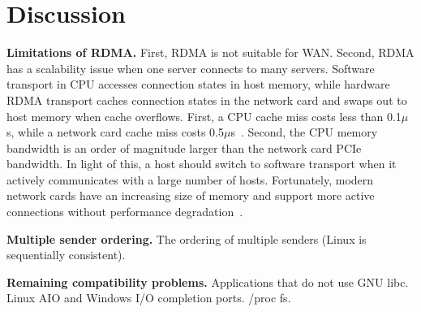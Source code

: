\section{Discussion}
\label{socksdirect:sec:discussion}

\textbf{Limitations of RDMA.} First, RDMA is not suitable for WAN. Second, RDMA has a scalability issue when one server connects to many servers. Software transport in CPU accesses connection states in host memory, while hardware RDMA transport caches connection states in the network card and swaps out to host memory when cache overflows. First, a CPU cache miss costs less than 0.1$\mu$s, while a network card cache miss costs 0.5$\mu$s~\cite{kaminsky2016design}. Second, the CPU memory bandwidth is an order of magnitude larger than the network card PCIe bandwidth. In light of this, a host should switch to software transport when it actively communicates with a large number of hosts. Fortunately, modern network cards have an increasing size of memory and support more active connections without performance degradation~\cite{kaminsky2016design}.

\textbf{Multiple sender ordering.}
The ordering of multiple senders (Linux is sequentially consistent).

\textbf{Remaining compatibility problems.}
Applications that do not use GNU libc.
Linux AIO and Windows I/O completion ports.
/proc fs.
